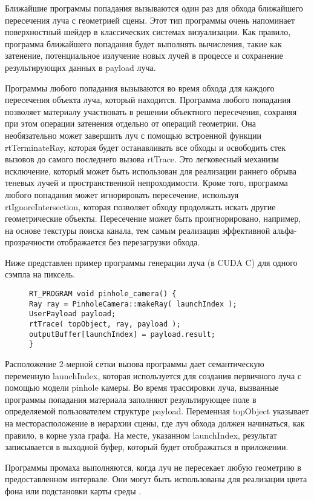 Ближайшие программы попадания вызываются один раз  для обхода ближайшего  пересечения луча с геометрией сцены.
 Этот тип программы очень напоминает поверхностный шейдер в классических системах визуализации.
 Как правило, программа ближайшего попадания будет выполнять вычисления, такие как затенение, потенциальное излучение новых лучей в процессе и сохранение результирующих данных в payload луча.

Программы любого попадания вызываются во время обхода для каждого пересечения объекта луча, который находится.
Программа любого попадания позволяет материалу участвовать в решении объектного пересечения, сохраняя при этом операции затенения отдельно от операций геометрии.
Она необязательно может завершить луч с помощью встроенной функции rtTerminateRay, которая будет останавливать все обходы и освободить стек вызовов до самого последнего вызова rtTrace.
Это легковесный механизм исключение, который может быть использован для реализации раннего обрыва теневых лучей и пространственной непроходимости.
Кроме того, программа любого попадания может игнорировать пересечение, используя rtIgnoreIntersection, которая позволяет обходу продолжать искать другие геометрические объекты.
Пересечение может быть проигнорировано, например, на основе текстуры поиска канала, тем самым реализация эффективной альфа-прозрачности отображается без перезагрузки обхода. 

Ниже представлен пример программы генерации луча (в CUDA C) для одного сэмпла на пиксель.
\begin{figure}[h]
\begin{verbatim}
RT_PROGRAM void pinhole_camera() {
Ray ray = PinholeCamera::makeRay( launchIndex );
UserPayload payload;
rtTrace( topObject, ray, payload );
outputBuffer[launchIndex] = payload.result;
}
\end{verbatim}
\end{figure}
Расположение 2-мерной сетки вызова программы дает семантическую переменную launchIndex, которая используется для создания первичного луча с помощью модели pinhole камеры.
Во время трассировки луча, вызванные программы попадания материала заполняют результирующее поле в определяемой пользователем структуре payload.
Переменная topObject указывает на месторасположение в иерархии сцены, где луч обхода должен начинаться, как правило, в корне узла графа.
На месте, указанном launchIndex, результат записывается в выходной буфер, который будет отображаться в приложении.

  Программы промаха выполняются, когда луч не пересекает любую геометрию в предоставленном интервале.
  Они могут быть использованы для реализации цвета фона или подстановки карты среды .

